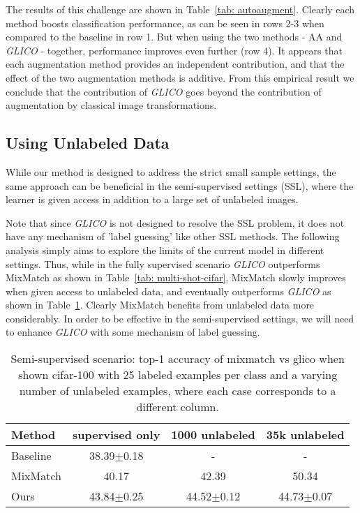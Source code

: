 \documentclass[a4paper,conference]{IEEEtran}
\begin{document}
The results of this challenge are shown in Table~\ref{tab: autoaugment}. Clearly each method boosts classification performance, as can be seen in rows 2-3 when compared to the baseline in row 1. But when using the two methods - AA and \textit{GLICO} - together, performance improves even further (row 4). It appears that each augmentation method provides an independent contribution, and that the effect of the two augmentation methods is additive. From this empirical result we conclude that the contribution of \textit{GLICO} goes beyond the contribution of augmentation by classical image transformations. 

\subsection{Using Unlabeled Data}		
\label{sec:other methods}

While our method is designed to address the strict small sample settings, the same approach can be beneficial in the semi-supervised settings (SSL), where the learner is given access in addition to a large set of unlabeled images.

Note that since \textit{GLICO} is not designed to resolve the SSL problem, it does not have any mechanism of 'label guessing' like other SSL methods. The following analysis simply aims to explore the limits of the current model in different settings. 
Thus, while in the fully supervised scenario \textit{GLICO} outperforms MixMatch as shown in Table~\ref{tab: multi-shot-cifar}, MixMatch slowly improves when given access to unlabeled data, and eventually outperforms \textit{GLICO} as shown in Table~\ref{tab: semisuprvised}. Clearly MixMatch benefits from unlabeled data more considerably. In order to be effective in the semi-supervised settings, we will need to enhance \textit{GLICO} with some mechanism of label guessing. 

\begin{table}[htbp]
	\centering
			
	\caption{Semi-supervised scenario:\MakeLowercase{ Top-1 Accuracy of MixMatch vs GLICO when shown CIFAR-100 with 25 labeled examples per class and a varying number of unlabeled examples, where each case corresponds to a different column.}
	}	
	\label{tab: semisuprvised}
\begin{tabular}{l|ccc}
		\toprule
		Method   & supervised only & 1000 unlabeled & 35k unlabeled  \\
		\midrule
		Baseline & 38.39$\pm$0.18  & -              & -              \\
		MixMatch & 40.17           & 42.39          & 50.34          \\
		Ours     & 43.84$\pm$0.25  & 44.52$\pm$0.12 & 44.73$\pm$0.07 \\
																
		\bottomrule
	\end{tabular}
\end{table}
\end{document}
